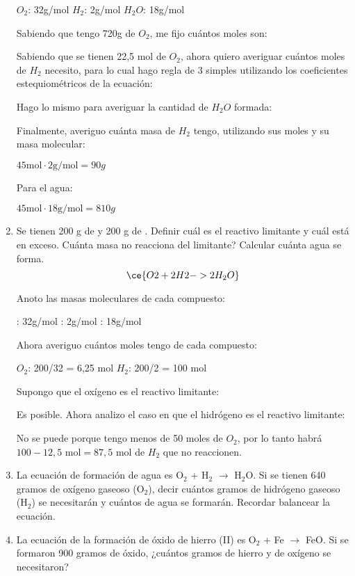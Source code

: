 \begin{enumerate}
\hfil$O_2$: 32g/mol\hfil
$H_2$: 2g/mol\hfil
$H_2O$: 18g/mol\hfil

\skipline
Sabiendo que tengo 720g de $O_2$, me fijo cuántos moles son:

Sabiendo que se tienen 22,5 mol de $O_2$, ahora quiero averiguar cuántos moles de $H_2$ necesito, para lo cual hago regla de 3 simples utilizando los coeficientes estequiométricos de la ecuación:

Hago lo mismo para averiguar la cantidad de $H_2O$ formada:

Finalmente, averiguo cuánta masa de $H_2$ tengo, utilizando sus moles y su masa molecular:

$45 \text{mol} \cdot 2\text{g/mol} = 90 g$

Para el agua:

$45 \text{mol} \cdot 18\text{g/mol} = 810g$


\item 
Se tienen 200 g de  y 200 g de .
Definir cuál es el reactivo limitante y cuál está en exceso.
Cuánta masa no reacciona del limitante?
Calcular cuánta agua se forma.
$$\ce{O2 + 2H2 -> 2H_2O}$$

Anoto las masas moleculares de cada compuesto:

\hfil{}: 32g/mol\hfil
{}: 2g/mol\hfil
{}: 18g/mol\hfil

\skipline
Ahora averiguo cuántos moles tengo de cada compuesto:

\hfil$O_2$: 200/32 = 6,25 mol\hfil
$H_2$: 200/2 = 100 mol\hfil

\skipline
Supongo que el oxígeno es el reactivo limitante:

Es posible. Ahora analizo el caso en que el hidrógeno es el reactivo limitante:

No se puede porque tengo menos de 50 moles de $O_2$, por lo tanto habrá $100-12,5 \text{ mol} = 87,5 \text{ mol}$ de $H_2$ que no reaccionen.


\item La ecuación de formación de agua es O$_2$ + H$_2$ $\longrightarrow$ H$_2$O. Si se tienen 640 gramos de oxígeno gaseoso (O$_2$), decir cuántos gramos de hidrógeno gaseoso (H$_2$) se necesitarán y cuántos de agua se formarán. Recordar balancear la ecuación.

\item La ecuación de la formación de óxido de hierro (II) es O$_2$ + Fe $\longrightarrow$ FeO. Si se formaron 900 gramos de óxido, ¿cuántos gramos de hierro y de oxígeno se necesitaron?


\end{enumerate}
